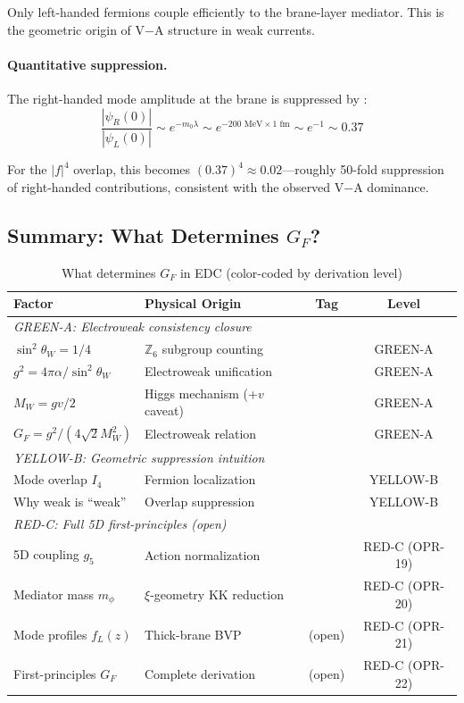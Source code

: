 Only left-handed fermions couple efficiently to the brane-layer mediator.
This is the geometric origin of V$-$A structure in weak currents.

\paragraph{Quantitative suppression.}
The right-handed mode amplitude at the brane is suppressed by \tagDc{}:
\begin{equation}
    \frac{|\psi_R(0)|}{|\psi_L(0)|} \sim e^{-m_0\lambda} \sim e^{-200 \text{ MeV} \times 1 \text{ fm}}
    \sim e^{-1} \sim 0.37
    \label{eq:ch11_chiral_suppression}
\end{equation}

For the $|f|^4$ overlap, this becomes $(0.37)^4 \approx 0.02$---roughly 50-fold
suppression of right-handed contributions, consistent with the observed
V$-$A dominance.

\subsection{Summary: What Determines $G_F$?}
\label{sec:ch11_summary_table}

\begin{table}[ht]
\centering
\caption{What determines $G_F$ in EDC (color-coded by derivation level)}
\label{tab:ch11_summary}
\begin{tabular}{p{3.5cm}p{4.5cm}cc}
\toprule
\textbf{Factor} & \textbf{Physical Origin} & \textbf{Tag} & \textbf{Level} \\
\midrule
\multicolumn{4}{l}{\textit{GREEN-A: Electroweak consistency closure}} \\
$\sin^2\theta_W = 1/4$ & $\mathbb{Z}_6$ subgroup counting & \tagDer{} & GREEN-A \\
$g^2 = 4\pi\alpha/\sin^2\theta_W$ & Electroweak unification & \tagDc{} & GREEN-A \\
$M_W = gv/2$ & Higgs mechanism (+$v$ caveat) & \tagDc{} & GREEN-A \\
$G_F = g^2/(4\sqrt{2}M_W^2)$ & Electroweak relation & \tagDc{} & GREEN-A \\
\midrule
\multicolumn{4}{l}{\textit{YELLOW-B: Geometric suppression intuition}} \\
Mode overlap $I_4$ & Fermion localization & \tagP{} & YELLOW-B \\
Why weak is ``weak'' & Overlap suppression & \tagI{} & YELLOW-B \\
\midrule
\multicolumn{4}{l}{\textit{RED-C: Full 5D first-principles (open)}} \\
5D coupling $g_5$ & Action normalization & \tagP{} & RED-C (OPR-19) \\
Mediator mass $m_\phi$ & $\xi$-geometry KK reduction & \tagP{} & RED-C (OPR-20) \\
Mode profiles $f_L(z)$ & Thick-brane BVP & (open) & RED-C (OPR-21) \\
First-principles $G_F$ & Complete derivation & (open) & RED-C (OPR-22) \\
\bottomrule
\end{tabular}
\end{table}

